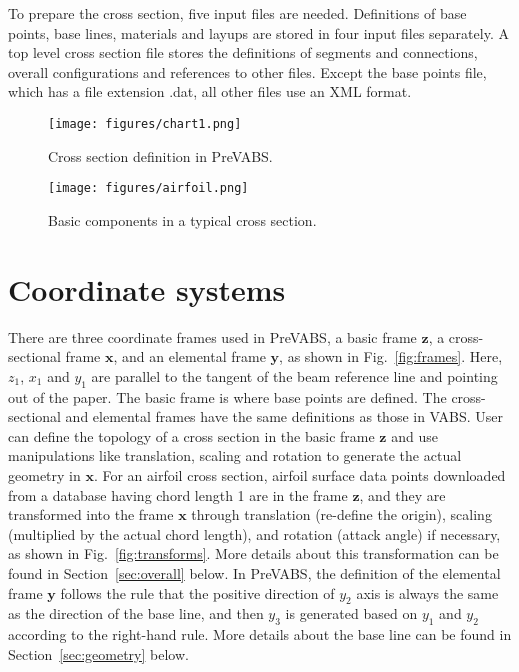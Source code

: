\documentclass{book}
\begin{document}
To prepare the cross section, five input files are needed. Definitions 
of base points, base lines, materials and layups are stored in four 
input files separately. A top level cross section file stores the 
definitions of segments and connections, overall configurations and 
references to other files. Except the base points file, which has a 
file extension .dat, all other files use an XML format.

\begin{figure}
  \centerline{\texttt{[image: figures/chart1.png]}}
  \caption{Cross section definition in PreVABS.}
  \label{fig:csfiles1}
\end{figure}

\begin{figure}
  \centerline{\texttt{[image: figures/airfoil.png]}}
  \caption{Basic components in a typical cross section.}
  \label{fig:airfoil1}
\end{figure}


\section{Coordinate systems}
\label{sec:coordinate}

There are three coordinate frames used in PreVABS, a basic frame $\mathbf z$, 
a cross-sectional frame $\mathbf x$, and an elemental frame $\mathbf y$, as shown in 
Fig.~\ref{fig:frames}. Here, $z_1$, $x_1$ and $y_1$ are parallel to the 
tangent of the beam reference line and pointing out of the paper. The 
basic frame is where base points are defined. The cross-sectional and 
elemental frames have the same definitions as those in VABS. User can 
define the topology of a cross section in the basic frame $\mathbf z$ and use 
manipulations like translation, scaling and rotation to generate the 
actual geometry in $\mathbf x$. For an airfoil cross section, airfoil surface 
data points downloaded from a database having chord length 1 are in the 
frame $\mathbf z$, and they are transformed into the frame $\mathbf x$ through translation 
(re-define the origin), scaling (multiplied by the actual chord length), 
and rotation (attack angle) if necessary, as shown in Fig.~\ref{fig:transforms}. 
More details about this transformation can be found in Section~\ref{sec:overall} 
below. In PreVABS, the definition of the elemental frame $\mathbf y$ 
follows the rule that the positive direction of $y_2$ axis is always 
the same as the direction of the base line, and then $y_3$ is generated 
based on $y_1$ and $y_2$ according to the right-hand rule. More details 
about the base line can be found in Section~\ref{sec:geometry} below.
\end{document}
